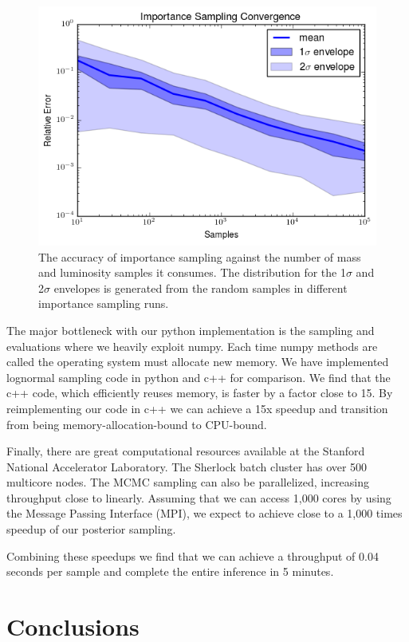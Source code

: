 \documentclass[\docopts]{\docclass}
\begin{document}
\begin{figure}[h]
\centering
\includegraphics[width=0.9\columnwidth]{is_convergence.png}
\caption{
The accuracy of importance sampling against the number of mass and luminosity samples it consumes. The distribution for the 1$\sigma$ and 2$\sigma$ envelopes is generated from the random samples in different importance sampling runs.
\label{fig:is_convergence}}
\end{figure}

The major bottleneck with our python implementation is the sampling and evaluations where we heavily exploit numpy. Each time numpy methods are called the operating system must allocate new memory. We have implemented lognormal sampling code in python and c++ for comparison. We find that the c++ code, which efficiently reuses memory, is faster by a factor close to 15. By reimplementing our code in c++ we can achieve a 15x speedup and transition from being memory-allocation-bound to CPU-bound.

Finally, there are great computational resources available at the Stanford National Accelerator Laboratory. The Sherlock batch cluster has over 500 multicore nodes. The MCMC sampling can also be parallelized, increasing throughput close to linearly. Assuming that we can access 1,000 cores by using the Message Passing Interface (MPI), we expect to achieve close to a 1,000 times speedup of our posterior sampling.

Combining these speedups we find that we can achieve a throughput of 0.04 seconds per sample and complete the entire inference in 5 minutes.


\section{Conclusions}
\label{sec:conclusions}
\end{document}
